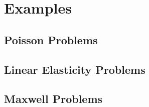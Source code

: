 %
%

\chapter{Examples}
\label{chap:examples}


\section{Poisson Problems}
\label{sec:poisson}

\section{Linear Elasticity Problems}
\label{sec:elasticity}

\section{Maxwell Problems}
\label{sec:maxwell}

%


